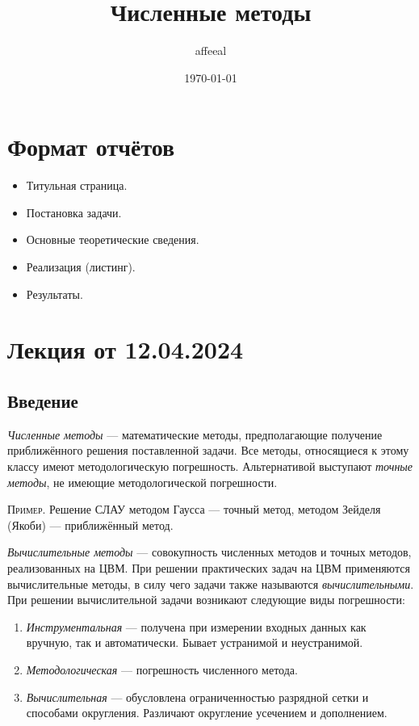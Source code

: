 \documentclass{article}
\title{Численные методы}
\author{affeeal}
\date{\today}
\begin{document}
\maketitle

\pagebreak

\tableofcontents

\pagebreak

\section{Формат отчётов}

\begin{itemize}
  \item Титульная страница.
  \item Постановка задачи.
  \item Основные теоретические сведения.
  \item Реализация (листинг).
  \item Результаты.
\end{itemize}

\section{Лекция от 12.04.2024}

\subsection{Введение}

\textit{Численные методы} --- математические методы, предполагающие получение
приближённого решения поставленной задачи. Все методы, относящиеся к этому
классу имеют методологическую погрешность. Альтернативой выступают
\textit{точные методы}, не имеющие методологической погрешности.

\textsc{Пример}. Решение СЛАУ методом Гаусса --- точный метод, методом Зейделя
(Якоби) --- приближённый метод.

\textit{Вычислительные методы} --- совокупность численных методов и точных
методов, реализованных на ЦВМ. При решении практических задач на ЦВМ применяются
вычислительные методы, в силу чего задачи также называются
\textit{вычислительными}. При решении вычислительной задачи возникают следующие
виды погрешности:

\begin{enumerate}
  \item \textit{Инструментальная} --- получена при измерении входных данных как
    вручную, так и автоматически. Бывает устранимой и неустранимой.

  \item \textit{Методологическая} --- погрешность численного метода.

  \item \textit{Вычислительная} --- обусловлена ограниченностью разрядной
    сетки и способами округления. Различают округление усечением и дополнением.
\end{enumerate}
\end{document}
